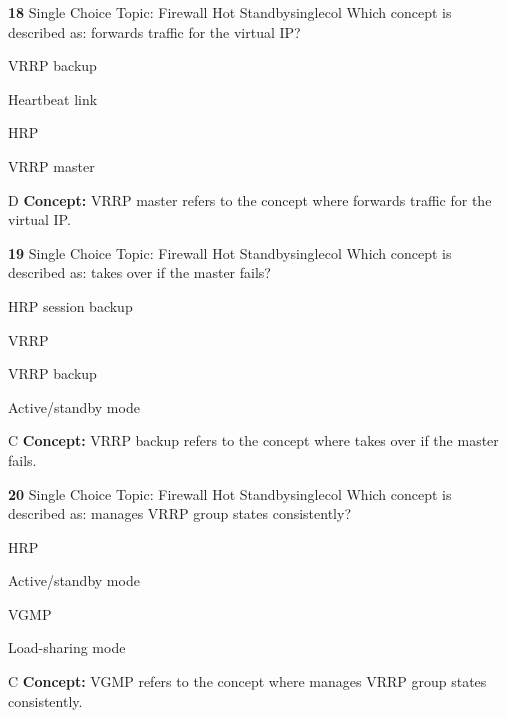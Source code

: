 \documentclass[10pt,a4paper]{article}
\begin{document}
\begin{qcard}{\color{white}\textbf{18} \hfill \small Single Choice \textbar{} Topic: Firewall Hot Standby}{singlecol}
Which concept is described as: forwards traffic for the virtual IP?

\begin{qoptions}
\item VRRP backup
\item Heartbeat link
\item HRP
\item VRRP master
\end{qoptions}
\begin{explainbox}{D}
\textbf{Concept:} VRRP master refers to the concept where forwards traffic for the virtual IP.
\end{explainbox}
\end{qcard}

\begin{qcard}{\color{white}\textbf{19} \hfill \small Single Choice \textbar{} Topic: Firewall Hot Standby}{singlecol}
Which concept is described as: takes over if the master fails?

\begin{qoptions}
\item HRP session backup
\item VRRP
\item VRRP backup
\item Active/standby mode
\end{qoptions}
\begin{explainbox}{C}
\textbf{Concept:} VRRP backup refers to the concept where takes over if the master fails.
\end{explainbox}
\end{qcard}

\begin{qcard}{\color{white}\textbf{20} \hfill \small Single Choice \textbar{} Topic: Firewall Hot Standby}{singlecol}
Which concept is described as: manages VRRP group states consistently?

\begin{qoptions}
\item HRP
\item Active/standby mode
\item VGMP
\item Load-sharing mode
\end{qoptions}
\begin{explainbox}{C}
\textbf{Concept:} VGMP refers to the concept where manages VRRP group states consistently.
\end{explainbox}
\end{qcard}
\end{document}
